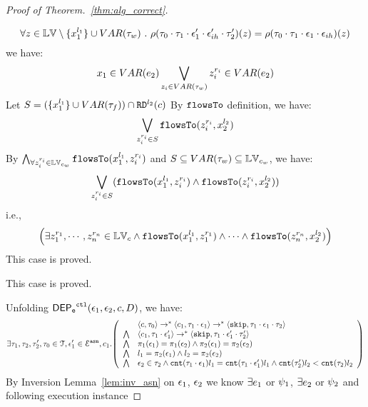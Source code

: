 \begin{proof}[Proof of Theorem.~\ref{thm:alg_correct}]
\begin{case}
\begin{subcase}
\begin{subsubcase}
\begin{subsubsubcase}
\begin{subproof}
\begin{enumerate}
\[
  \forall z \in \mathbb{LV} \setminus \{x_1^{l_1}\} \cup VAR{(\mathtt{\tau}_w)} ~.~
  \rho(\mathtt{\tau}_0 \cdot \mathtt{\tau}_1 \cdot \mathtt{\epsilon}_1'\cdot \mathtt{\epsilon}_{ih}' \cdot \mathtt{\tau}_2')(z) 
  = \rho(\mathtt{\tau}_0 \cdot \mathtt{\tau}_1 \cdot \mathtt{\epsilon}_1\cdot \mathtt{\epsilon}_{ih})(z)
\]
%
we have:
\[
  x_1 \in VAR(e_2) \bigvee_{z_i \in VAR{(\mathtt{\tau}_w)}} z_i^{r_i} \in VAR(e_2)
\]
%
Let $S = (\{x_1^{l_1}\} \cup VAR{(\mathtt{\tau}_f)}) \cap \mathtt{RD}^{l_2}(c) $
%
By $\mathtt{flowsTo}$ definition, we have:
\[
   \bigvee_{z_i^{r_i} \in S}  \mathtt{flowsTo}(z_i^{r_i}, x_2^{l_2})
\]
By $ \bigwedge_{\forall z_i^{r_i} \in \mathbb{LV}_{c_w}} \mathtt{flowsTo}(x_1^{l_1}, z_i^{r_i})$ and $S \subseteq VAR{(\mathtt{\tau}_w)} \subseteq \mathbb{LV}_{c_w}$, we have:
\[
\bigvee_{z_i^{r_i} \in S} 
(\mathtt{flowsTo}(x_1^{l_1}, z_i^{r_i}) \land \mathtt{flowsTo}(z_i^{r_i}, x_2^{l_2}))
\]
%
i.e.,
\[
\Big(\exists z_1^{r_1}, \cdots, z_n^{r_n} \in \mathbb{LV}_{{c}}
 \land \mathtt{flowsTo}(x_1^{l_1}, z_1^{r_1}) \land \cdots \land \mathtt{flowsTo}(z_n^{r_n}, {x}_2^{l_2}) \Big)
\]
%
This case is proved.
\end{enumerate}
\end{subproof}
%
This case is proved.
\end{subsubsubcase}
\end{subsubcase}
\end{subcase}
\end{case}
%
Unfolding $\mathsf{DEP_{\mathtt{e}}}^{\mathtt{{ctl}}}(\mathtt{\epsilon}_1, \mathtt{\epsilon}_2, c, D)$, we have:
%
\[
\exists \vtrace_1, \vtrace_2, \vtrace_2', \vtrace_0 \in \mathcal{T}, 
\event_1' \in \eventset^{\asn}, {c}_1.
\left(
\begin{array}{ll}   
  & \config{{c}, \vtrace_0} \rightarrow^{*} 
    \config{{c}_1, \vtrace_1 \cdot \event_1}  \rightarrow^{*} 
    \config{\eskip,  \vtrace_1 \cdot \event_1 \cdot \vtrace_2} 
  \\ 
  \bigwedge &
  \config{{c}_1, \vtrace_1 \cdot \event_1'}  \rightarrow^{*} 
  \config{\eskip,  \vtrace_1 \cdot \event_1' \cdot \vtrace_2' } 
  \\
  \bigwedge &  \pi_1(\event_1) = \pi_1(\event_2) \land \pi_2(\event_1) = \pi_2(\event_2) \\
  \bigwedge & l_1 = \pi_2(\event_1) \land l_2 = \pi_2(\event_2)
  \\
  \bigwedge & \event_2 \in \trace_2 \land \vcounter(\vtrace_1 \cdot \event_1) l_1 = \vcounter(\vtrace_1 \cdot \event_1')l_1  \land \vcounter(\vtrace_2') l_2 < \vcounter(\trace_2) l_2 
\end{array}
\right)
 \]%
By Inversion Lemma~\ref{lem:inv_asn} on 
 $\mathtt{\epsilon}_1$, $\mathtt{\epsilon}_2$ we know $\exists e_1$ or $\psi_1$, $\exists e_2$ or $\psi_2$ and following execution instance

\end{proof}
